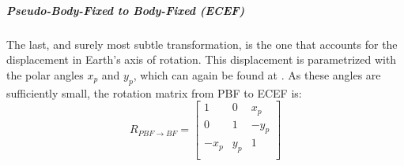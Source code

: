 		\subparagraph{Pseudo-Body-Fixed to Body-Fixed (ECEF)\\}
		\indent The last, and surely most subtle transformation, is the one that accounts for the displacement in Earth's axis of rotation. This displacement is parametrized with the polar angles $x_p$ and $y_p$, which can again be found at \cite{IERS_conventions}. As these angles are sufficiently small, the rotation matrix from PBF to ECEF is:\\
		\begin{equation}
		R_{PBF\rightarrow BF} = 
		\left[ 
		\begin{array}{lll}
		1		& 0 	& x_p \\
		0 		& 1 	& -y_p \\
		-x_p 	& y_p 	& 1 \\
		\end{array}
		\right]
		\label{eq: R_PBF_ECEF}
		\end{equation}
